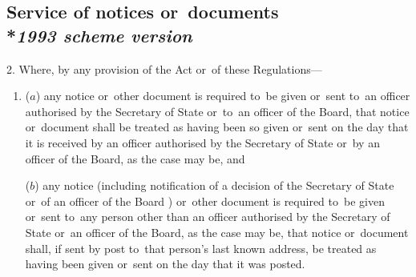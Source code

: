 \documentclass[12pt,a4paper]{article}
\begin{document}
\subsection[2. Service of notices or~documents --- \emph{1993 scheme version}]{Service of notices or~documents\\*\emph{1993 scheme version}}

2.  Where, by any provision of the Act or~of these Regulations—
\begin{enumerate}\item[]
($a$) any notice or~other document is required to~be given or~sent 
to~an officer authorised by the Secretary of State
or~to~an officer of the Board,  %
that notice or~document shall be treated as having been so given or~sent on the day that it is received 
by an officer authorised by the Secretary of State
or~by an officer of the Board,  %
as the case may be, and

($b$) any notice (including notification of a decision of the Secretary of State
or~of an officer of the Board%
) or~other document is required to~be given or~sent to~any person other than 
an officer  %
authorised by the Secretary of State
or~an officer of the Board,  %
as the case may be, that notice or~document shall, if sent by post to~that person’s last known address, be treated as having been given or~sent on the day that it was posted.
\end{enumerate}

\end{document}

